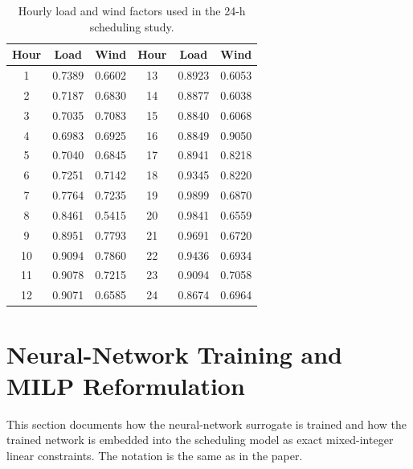 \documentclass[letterpaper,journal]{IEEEtran}
\begin{document}
\begin{table}[!t]
\centering
\caption{Hourly load and wind factors used in the 24-h scheduling study.}
\label{tab:profiles}
\footnotesize
\setlength{\tabcolsep}{5pt}
\begin{tabular}{@{}ccc@{\hspace{1.2em}}ccc@{}}
\toprule
Hour & Load & Wind & Hour & Load & Wind \\
\midrule
 1 & 0.7389 & 0.6602 & 13 & 0.8923 & 0.6053 \\
 2 & 0.7187 & 0.6830 & 14 & 0.8877 & 0.6038 \\
 3 & 0.7035 & 0.7083 & 15 & 0.8840 & 0.6068 \\
 4 & 0.6983 & 0.6925 & 16 & 0.8849 & 0.9050 \\
 5 & 0.7040 & 0.6845 & 17 & 0.8941 & 0.8218 \\
 6 & 0.7251 & 0.7142 & 18 & 0.9345 & 0.8220 \\
 7 & 0.7764 & 0.7235 & 19 & 0.9899 & 0.6870 \\
 8 & 0.8461 & 0.5415 & 20 & 0.9841 & 0.6559 \\
 9 & 0.8951 & 0.7793 & 21 & 0.9691 & 0.6720 \\
10 & 0.9094 & 0.7860 & 22 & 0.9436 & 0.6934 \\
11 & 0.9078 & 0.7215 & 23 & 0.9094 & 0.7058 \\
12 & 0.9071 & 0.6585 & 24 & 0.8674 & 0.6964 \\
\bottomrule
\end{tabular}
\end{table}

\section{Neural-Network Training and MILP Reformulation}

This section documents how the neural-network surrogate is trained and how the trained
network is embedded into the scheduling model as exact mixed-integer linear constraints. The
notation is the same as in the paper.
\end{document}
